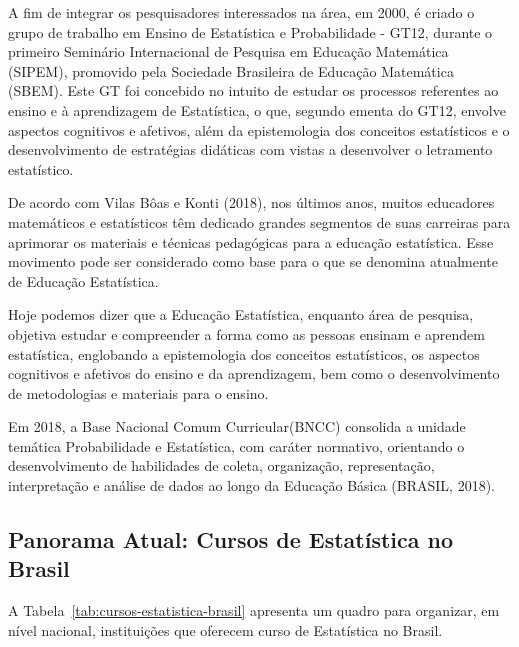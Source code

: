 A fim de integrar os pesquisadores interessados na área, em 2000, é criado o grupo de trabalho em Ensino de Estatística e Probabilidade - GT12, durante o primeiro Seminário Internacional de Pesquisa em Educação Matemática (SIPEM), promovido pela Sociedade Brasileira de Educação Matemática (SBEM). Este GT foi concebido no intuito de estudar os processos referentes ao ensino e à aprendizagem de Estatística, o que, segundo ementa do GT12, envolve aspectos cognitivos e afetivos, além da epistemologia dos conceitos estatísticos e o desenvolvimento de estratégias didáticas com vistas a desenvolver o letramento estatístico. \vskip0.3cm

De acordo com Vilas Bôas e Konti (2018), nos últimos anos, muitos educadores matemáticos e estatísticos têm dedicado grandes segmentos de suas carreiras para aprimorar os materiais e técnicas pedagógicas para a educação estatística. Esse movimento pode ser considerado como base para o que se denomina atualmente de Educação Estatística. \vskip0.3cm

Hoje podemos dizer que a Educação Estatística, enquanto área de pesquisa, objetiva estudar e compreender a forma como as pessoas ensinam e aprendem estatística, englobando a epistemologia dos conceitos estatísticos, os aspectos cognitivos e afetivos do ensino e da aprendizagem, bem como o desenvolvimento de metodologias e materiais para o ensino. \vskip0.3cm

Em 2018, a Base Nacional Comum Curricular(BNCC) consolida a unidade temática Probabilidade e Estatística, com caráter normativo, orientando o desenvolvimento de habilidades de coleta, organização, representação, interpretação e análise de dados ao longo da Educação Básica (BRASIL, 2018).\vskip0.3cm


\newpage
\subsection{Panorama Atual: Cursos de Estatística no Brasil}
\vskip0.2cm

A Tabela~\ref{tab:cursos-estatistica-brasil} apresenta um quadro para organizar, em nível nacional, instituições que oferecem curso de Estatística no Brasil. \vskip0.2cm



